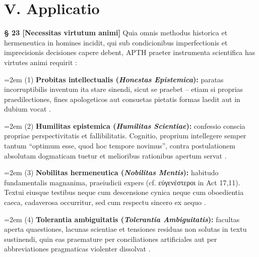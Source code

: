 \documentclass[11pt,a4paper]{article}
\makeatletter
\newcommand{\apth}{{\apthfont APTH}\hspace{0.15em}\xspace}
\newcommand{\subpar}[1]{%
  \begingroup
  \leftskip=2em %
  \noindent#1\par
  \endgroup
}
\newcommand{\apthsec}[3]{%
  \phantomsection%
  \def\@currentlabel{#1}%
  \label{sec:#3}%
  \textbf{§ #1 [#2]}%
}
\makeatother
\begin{document}
\section*{V. Applicatio}

\apthsec{23}{Necessitas virtutum animi}{tugenden} Quia omnis methodus historica et hermeneutica in homines incidit, qui sub condicionibus imperfectionis et imprecisionis decisiones capere debent, \apth praeter instrumenta scientifica has virtutes animi requirit \citep{zagzebski1996}:

\subpar{(1) \textbf{Probitas intellectualis (\textit{Honestas Epistemica}):} paratas incorruptibilis inventum ita stare sinendi, sicut se praebet -- etiam si proprias praedilectiones, fines apologeticos aut consuetas pietatis formas laedit aut in dubium vocat \citep{williams2002}.}

\subpar{(2) \textbf{Humilitas epistemica (\textit{Humilitas Scientiae}):} confessio conscia propriae perspectivitatis et fallibilitatis. Cognitio, proprium intellegere semper tantum ``optimum esse, quod hoc tempore novimus'', contra postulationem absolutam dogmaticam tuetur et melioribus rationibus apertum servat \citep{popper1963}.}

\subpar{(3) \textbf{Nobilitas hermeneutica (\textit{Nobilitas Mentis}):} habitudo fundamentalis magnanima, praeiudicii expers (cf. εὐγενέστεροι in Act 17,11). Textui eiusque testibus neque cum descensione cynica neque cum oboedientia caeca, cadaverosa occurritur, sed cum respectu sincero ex aequo \citep{davidson1974,jacobs2001}.}

\subpar{(4) \textbf{Tolerantia ambiguitatis (\textit{Tolerantia Ambiguitatis}):} facultas aperta quaestiones, lacunas scientiae et tensiones residuas non solutas in textu sustinendi, quin eas praemature per conciliationes artificiales aut per abbreviationes pragmaticas violenter dissolvat \citep{frenkelbrunswik1949}.}
\end{document}

